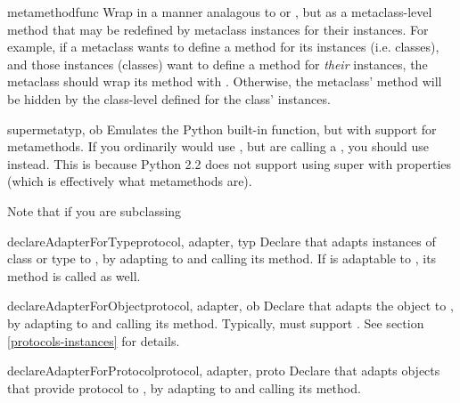 \begin{verbatim%
}
\begin{verbatim%
}
\begin{verbatim%
}
\begin{verbatim%
}
\begin{funcdesc}{metamethod}{func}
Wrap  in a manner analagous to  or
, but as a metaclass-level method that may be redefined
by metaclass instances for their instances.  For example, if a metaclass wants
to define a  method for its instances (i.e. classes), and
those instances (classes) want to define a  method for
\emph{their} instances, the metaclass should wrap its 
method with .  Otherwise, the metaclass'
 method will be hidden by the class-level
 defined for the class' instances.
\end{funcdesc}


\begin{funcdesc}{supermeta}{typ, ob}
Emulates the Python built-in  function, but with support for
metamethods.  If you ordinarily would use , but are calling a
, you should use  instead.  This is
because Python 2.2 does not support using super with properties (which is
effectively what metamethods are).

Note that if you are subclassing 
\end{funcdesc}


\begin{funcdesc}{declareAdapterForType}{protocol, adapter, typ }
Declare that  adapts instances of class or type 
to , by adapting  to  and
calling its  method.  If  is adaptable
to , its  method is
called as well.
\end{funcdesc}


\begin{funcdesc}{declareAdapterForObject}{protocol, adapter, ob }
Declare that  adapts the object  to , by
adapting  to  and calling its
 method.  Typically,  must support
.  See section \ref{protocols-instances} for details.
\end{funcdesc}


\begin{funcdesc}{declareAdapterForProtocol}{protocol, adapter, proto }
Declare that  adapts objects that provide protocol 
to , by adapting  to  and
calling its  method.
\end{funcdesc}

















\end{verbatim%
}
\end{verbatim%
}
\end{verbatim%
}
\end{verbatim%
}
